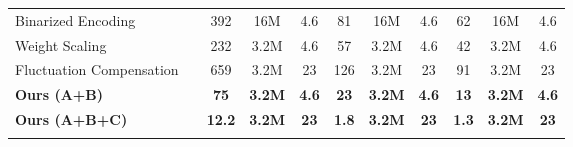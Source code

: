 \documentclass[10pt,journal,compsoc]{IEEEtran}
\begin{document}
\begin{table*}[!t]
{\begin{tabular}{l  c | c    c  c | c c c   | c c  c}
\hline											
Binarized Encoding	&\cite{zhu2019configurable}	&392	&16M	&4.6	&81	&16M	&4.6	&62	&16M	&4.6	\\
Weight Scaling	&\cite{ielmini2010resistance}	&232	&3.2M	&4.6	&57	&3.2M	&4.6	&42	&3.2M	&4.6	\\
Fluctuation Compensation	&\cite{wan2020voltage}	&659	&3.2M	&23	&126	&3.2M	&23	&91	&3.2M	&23	\\
\textbf{Ours (A+B)}	&	&\textbf{75}	&\textbf{3.2M}	&\textbf{4.6}	&\textbf{23}	&\textbf{3.2M}	&\textbf{4.6}	&\textbf{13}	&\textbf{3.2M}	&\textbf{4.6}	\\
\textbf{Ours (A+B+C)}	&	&\textbf{12.2}	&\textbf{3.2M}	&\textbf{23}	&\textbf{1.8}	&\textbf{3.2M}	&\textbf{23}	&\textbf{1.3}	&\textbf{3.2M}	&\textbf{23}	\\
\hline											
\hline																																																
\label{t:sota1}
\end{tabular}
}
\end{table*}

\end{document}
